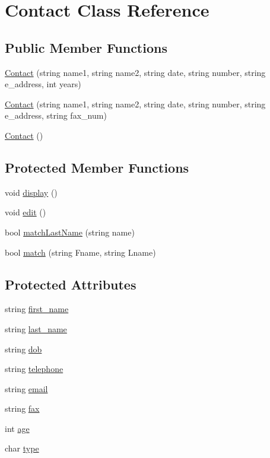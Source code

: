\hypertarget{classContact}{}\section{Contact Class Reference}
\label{classContact}
\subsection*{Public Member Functions}
\begin{DoxyCompactItemize}
\item 
\hyperlink{classContact_ac7308f96c0405d7ed945c786ad1b7d06}{Contact} (string name1, string name2, string date, string number, string e\+\_\+address, int years)
\item 
\hyperlink{classContact_a0cb74650123c8fb2adbaa3b27a8a45bb}{Contact} (string name1, string name2, string date, string number, string e\+\_\+address, string fax\+\_\+num)
\item 
\hyperlink{classContact_ae39444f378e6de7fd6c3e60981949af5}{Contact} ()
\end{DoxyCompactItemize}
\subsection*{Protected Member Functions}
\begin{DoxyCompactItemize}
\item 
void \hyperlink{classContact_a1a7b491fba3111a679bfae344d75d19d}{display} ()
\item 
void \hyperlink{classContact_a1e8e2536913df381990b8ed35d562dd6}{edit} ()
\item 
bool \hyperlink{classContact_aeff0842a6152f13203db721cd7c479fd}{match\+Last\+Name} (string name)
\item 
bool \hyperlink{classContact_a7d5d537bfe7be46e04b99c433fa00d01}{match} (string Fname, string Lname)
\end{DoxyCompactItemize}
\subsection*{Protected Attributes}
\begin{DoxyCompactItemize}
\item 
string \hyperlink{classContact_ac074ba210aa0e4a52921af8353384a59}{first\+\_\+name}
\item 
string \hyperlink{classContact_a87032ae00ab0e8cc81d660f191bcf0fa}{last\+\_\+name}
\item 
string \hyperlink{classContact_a50397132da5dc66f2cb289fc650c3df6}{dob}
\item 
string \hyperlink{classContact_ad23a96ecf0527e8878da50da682ba794}{telephone}
\item 
string \hyperlink{classContact_a7cb8a0ab45d0ddc7a83df39590fcb6c1}{email}
\item 
string \hyperlink{classContact_a2ff4fdc6afc1afdec2dbfe5cf85f1b92}{fax}
\item 
int \hyperlink{classContact_a68735c7a42c6b9b80ff1b084111e6069}{age}
\item 
char \hyperlink{classContact_ad76971e3edec9fdbc665d149cfbd9e1a}{type}
\end{DoxyCompactItemize}
